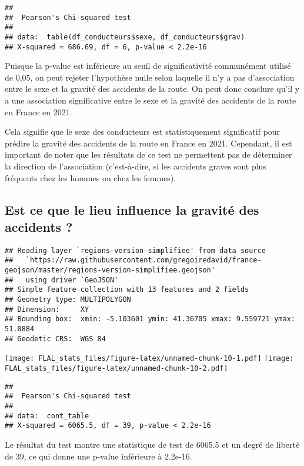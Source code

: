 \documentclass[
]{article}
\begin{document}
\begin{verbatim}
## 
##  Pearson's Chi-squared test
## 
## data:  table(df_conducteurs$sexe, df_conducteurs$grav)
## X-squared = 686.69, df = 6, p-value < 2.2e-16
\end{verbatim}

Puisque la p-value est inférieure au seuil de significativité
communément utilisé de 0,05, on peut rejeter l'hypothèse nulle selon
laquelle il n'y a pas d'association entre le sexe et la gravité des
accidents de la route. On peut donc conclure qu'il y a une association
significative entre le sexe et la gravité des accidents de la route en
France en 2021.

Cela signifie que le sexe des conducteurs est statistiquement
significatif pour prédire la gravité des accidents de la route en France
en 2021. Cependant, il est important de noter que les résultats de ce
test ne permettent pas de déterminer la direction de l'association
(c'est-à-dire, si les accidents graves sont plus fréquents chez les
hommes ou chez les femmes).

\hypertarget{est-ce-que-le-lieu-influence-la-gravituxe9-des-accidents}{%
\subsection{Est ce que le lieu influence la gravité des accidents
?}\label{est-ce-que-le-lieu-influence-la-gravituxe9-des-accidents}}

\begin{verbatim}
## Reading layer `regions-version-simplifiee' from data source 
##   `https://raw.githubusercontent.com/gregoiredavid/france-geojson/master/regions-version-simplifiee.geojson' 
##   using driver `GeoJSON'
## Simple feature collection with 13 features and 2 fields
## Geometry type: MULTIPOLYGON
## Dimension:     XY
## Bounding box:  xmin: -5.103601 ymin: 41.36705 xmax: 9.559721 ymax: 51.0884
## Geodetic CRS:  WGS 84
\end{verbatim}

\texttt{[image: FLAL\_stats\_files/figure-latex/unnamed-chunk-10-1.pdf]}
\texttt{[image: FLAL\_stats\_files/figure-latex/unnamed-chunk-10-2.pdf]}

\begin{verbatim}
## 
##  Pearson's Chi-squared test
## 
## data:  cont_table
## X-squared = 6065.5, df = 39, p-value < 2.2e-16
\end{verbatim}

Le résultat du test montre une statistique de test de 6065.5 et un degré
de liberté de 39, ce qui donne une p-value inférieure à 2.2e-16.
\end{document}
